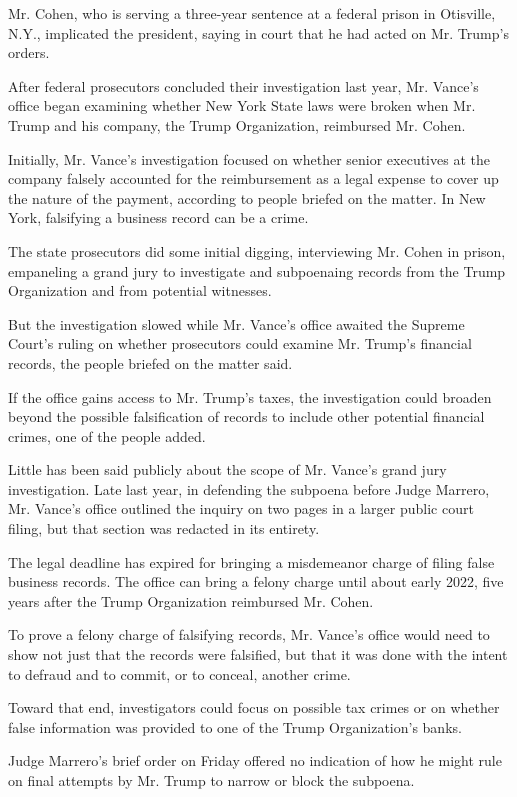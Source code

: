 Mr. Cohen, who is serving a three-year sentence at a federal prison in
Otisville, N.Y., implicated the president, saying in court that he had
acted on Mr. Trump's orders.

After federal prosecutors concluded their investigation last year, Mr.
Vance's office began examining whether New York State laws were broken
when Mr. Trump and his company, the Trump Organization, reimbursed Mr.
Cohen.

Initially, Mr. Vance's investigation focused on whether senior
executives at the company falsely accounted for the reimbursement as a
legal expense to cover up the nature of the payment, according to people
briefed on the matter. In New York, falsifying a business record can be
a crime.

The state prosecutors did some initial digging, interviewing Mr. Cohen
in prison, empaneling a grand jury to investigate and subpoenaing
records from the Trump Organization and from potential witnesses.

But the investigation slowed while Mr. Vance's office awaited the
Supreme Court's ruling on whether prosecutors could examine Mr. Trump's
financial records, the people briefed on the matter said.

If the office gains access to Mr. Trump's taxes, the investigation could
broaden beyond the possible falsification of records to include other
potential financial crimes, one of the people added.

Little has been said publicly about the scope of Mr. Vance's grand jury
investigation. Late last year, in defending the subpoena before Judge
Marrero, Mr. Vance's office outlined the inquiry on two pages in a
larger public court filing, but that section was redacted in its
entirety.

The legal deadline has expired for bringing a misdemeanor charge of
filing false business records. The office can bring a felony charge
until about early 2022, five years after the Trump Organization
reimbursed Mr. Cohen.

To prove a felony charge of falsifying records, Mr. Vance's office would
need to show not just that the records were falsified, but that it was
done with the intent to defraud and to commit, or to conceal, another
crime.

Toward that end, investigators could focus on possible tax crimes or on
whether false information was provided to one of the Trump
Organization's banks.

Judge Marrero's brief order on Friday offered no indication of how he
might rule on final attempts by Mr. Trump to narrow or block the
subpoena.

